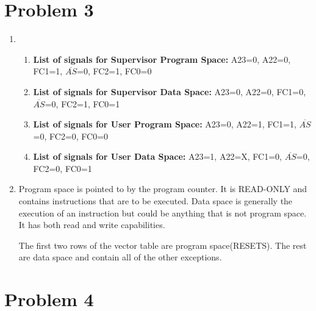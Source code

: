 \documentclass[12pt]{article}
\begin{document}
\section*{Problem 3}
\begin{enumerate}
	\item
		\begin{enumerate}
			\item \textbf{List of signals for Supervisor Program Space: }A23=0, A22=0, FC1=1, $\overline{AS}$=0, FC2=1, FC0=0
			
			\item \textbf{List of signals for Supervisor Data Space: }A23=0, A22=0, FC1=0, $\overline{AS}$=0, FC2=1, FC0=1
			
			\item \textbf{List of signals for User Program Space: }A23=0, A22=1, FC1=1, $\overline{AS}$=0, FC2=0, FC0=0
			
			\item \textbf{List of signals for User Data Space: }A23=1, A22=X, FC1=0, $\overline{AS}$=0, FC2=0, FC0=1
		\end{enumerate}
		
	\item Program space is pointed to by the program counter. It is READ-ONLY and contains instructions that are to be executed. Data space is generally the execution of an instruction but could be anything that is not program space. It has both read and write capabilities.
	
	The first two rows of the vector table are program space(RESETS). The rest are data space and contain all of the other exceptions.
\end{enumerate}

\section*{Problem 4}
\end{document}
